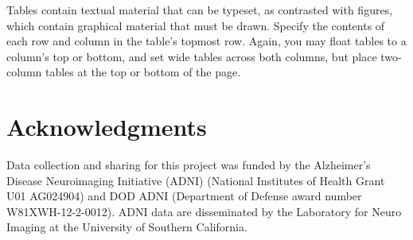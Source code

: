 \documentclass{article}
\begin{document}
Tables contain textual material that can be typeset, as contrasted 
with figures, which contain graphical material that must be drawn. 
Specify the contents of each row and column in the table's topmost
row. Again, you may float tables to a column's top or bottom, and set
wide tables across both columns, but place two-column tables at the
top or bottom of the page.
 
%
%
%
%

 
\section*{Acknowledgments} 
 
Data collection and sharing for this project was funded by the Alzheimer's Disease Neuroimaging Initiative (ADNI) (National Institutes of Health Grant U01 AG024904) and DOD ADNI (Department of Defense award number W81XWH-12-2-0012). ADNI data are disseminated by the Laboratory for Neuro Imaging at the University of Southern California.



\end{document}

